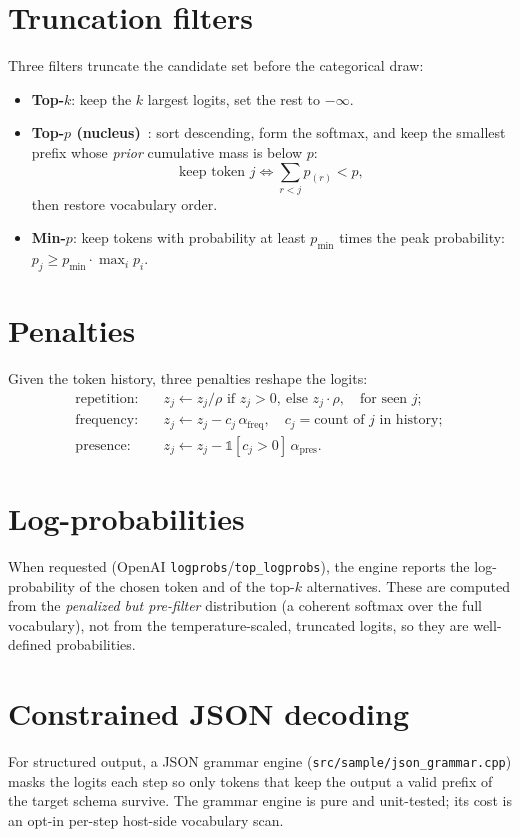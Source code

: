 \documentclass[11pt,a4paper]{report}
\newcommand{\code}[1]{\texttt{#1}}
\begin{document}
\section{Truncation filters}
Three filters truncate the candidate set before the categorical draw:
\begin{itemize}[nosep]
  \item \textbf{Top-$k$}: keep the $k$ largest logits, set the rest to $-\infty$.
  \item \textbf{Top-$p$ (nucleus)}~\citep{holtzman2020nucleus}: sort descending,
        form the softmax, and keep the smallest prefix whose \emph{prior} cumulative
        mass is below $p$:
        \begin{equation}
          \text{keep token } j \iff \sum_{r < j} p_{(r)} < p,
        \end{equation}
        then restore vocabulary order.
  \item \textbf{Min-$p$}: keep tokens with probability at least $p_{\min}$ times the
        peak probability: $p_j \ge p_{\min}\cdot \max_i p_i$.
\end{itemize}

\section{Penalties}
Given the token history, three penalties reshape the logits:
\begin{align}
  \text{repetition:}\quad & z_j \leftarrow z_j/\rho \text{ if } z_j>0,\ \text{else } z_j\cdot\rho, \quad \text{for seen } j;\\
  \text{frequency:}\quad  & z_j \leftarrow z_j - c_j\,\alpha_{\text{freq}}, \quad c_j = \text{count of } j \text{ in history};\\
  \text{presence:}\quad   & z_j \leftarrow z_j - \mathbb{1}[c_j>0]\,\alpha_{\text{pres}}.
\end{align}

\section{Log-probabilities}
When requested (OpenAI \code{logprobs}/\code{top\_logprobs}), the engine reports the
log-probability of the chosen token and of the top-$k$ alternatives. These are
computed from the \emph{penalized but pre-filter} distribution (a coherent softmax
over the full vocabulary), not from the temperature-scaled, truncated logits, so
they are well-defined probabilities.

\section{Constrained JSON decoding}
For structured output, a JSON grammar engine (\code{src/sample/json\_grammar.cpp})
masks the logits each step so only tokens that keep the output a valid prefix of the
target schema survive. The grammar engine is pure and unit-tested; its cost is an
opt-in per-step host-side vocabulary scan.
\end{document}
